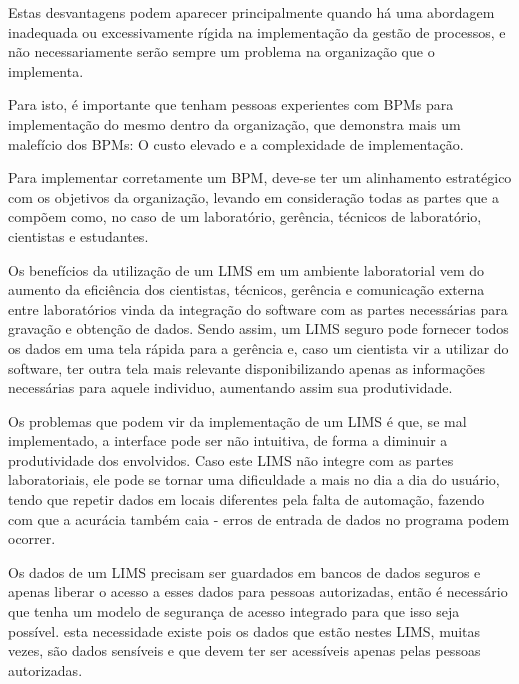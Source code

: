 Estas desvantagens podem aparecer principalmente quando há uma abordagem inadequada ou excessivamente rígida na implementação da gestão de processos, e não necessariamente serão sempre um problema na organização que o implementa.

Para isto, é importante que tenham pessoas experientes com BPMs para implementação do mesmo dentro da organização, que demonstra mais um malefício dos BPMs: O custo elevado e a complexidade de implementação.

Para implementar corretamente um BPM, deve-se ter um alinhamento estratégico com os objetivos da organização, levando em consideração todas as partes que a compõem como, no caso de um laboratório, gerência, técnicos de laboratório, cientistas e estudantes.



Os benefícios da utilização de um LIMS em um ambiente laboratorial vem do aumento da eficiência dos cientistas, técnicos, gerência e comunicação externa entre laboratórios vinda da integração do software com as partes necessárias para gravação e obtenção de dados. Sendo assim, um LIMS seguro pode fornecer todos os dados em uma tela rápida para a gerência e, caso um cientista vir a utilizar do software, ter outra tela mais relevante disponibilizando apenas as informações necessárias para aquele individuo, aumentando assim sua produtividade.


Os problemas que podem vir da implementação de um LIMS é que, se mal implementado, a interface pode ser não intuitiva, de forma a diminuir a produtividade dos envolvidos. Caso este LIMS não integre com as partes laboratoriais, ele pode se tornar uma dificuldade a mais no dia a dia do usuário, tendo que repetir dados em locais diferentes pela falta de automação, fazendo com que a acurácia também caia - erros de entrada de dados no programa podem ocorrer.



Os dados de um LIMS precisam ser guardados em bancos de dados seguros e apenas liberar o acesso a esses dados para pessoas autorizadas, então é necessário que tenha um modelo de segurança de acesso integrado para que isso seja possível. esta necessidade existe pois os dados que estão nestes LIMS, muitas vezes, são dados sensíveis e que devem ter ser acessíveis apenas pelas pessoas autorizadas.

